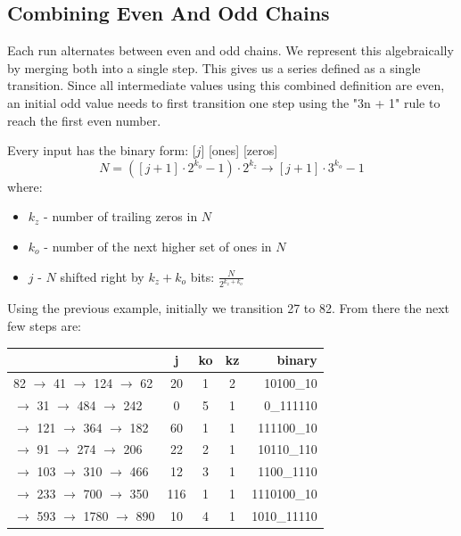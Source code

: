 \documentclass[letterpaper]{article}
\begin{document}
\begin{multicols}{2}
    \subsection{Combining Even And Odd Chains}

    Each run alternates between even and odd chains. We represent this algebraically by merging both into a single step. This gives us a series defined as a single transition. Since all intermediate values using this combined definition are even, an initial odd value needs to first transition one step using the "3n + 1" rule to reach the first even number.

    Every input has the binary form: [$j$] [ones] [zeros]
    \[
        N = ([j + 1] \cdot 2^{k_o} - 1) \cdot 2^{k_z} \rightarrow [j + 1] \cdot 3^{k_o} - 1
    \]
    where:
    \begin{itemize}
        \item $k_z$ - number of trailing zeros in $N$
        \item $k_o$ - number of the next higher set of ones in $N$
        \item $j$ - $N$ shifted right by $k_z + k_o$ bits: $\frac{N}{2^{k_z + k_o}}$
    \end{itemize}

    Using the previous example, initially we transition 27 to 82. From there the next few steps are:

    \noindent
    \begin{minipage}{\columnwidth}
        \setlength{\tabcolsep}{.35\tabcolsep}
        \centering
        \begin{tabular}{|l|c|c|c|r|}
            \hline
                                             & \textbf{j} & \textbf{ko} & \textbf{kz} & \textbf{binary} \\
            \hline
            82 $\to$ 41  $\to$  124 $\to$ 62 & 20         & 1           & 2           & 10100\_10       \\
            \hline
            $\to$ 31  $\to$  484 $\to$ 242   & 0          & 5           & 1           & 0\_111110       \\
            \hline
            $\to$ 121 $\to$  364 $\to$ 182   & 60         & 1           & 1           & 111100\_10      \\
            \hline
            $\to$  91 $\to$  274 $\to$ 206   & 22         & 2           & 1           & 10110\_110      \\
            \hline
            $\to$ 103 $\to$  310 $\to$ 466   & 12         & 3           & 1           & 1100\_1110      \\
            \hline
            $\to$ 233 $\to$  700 $\to$ 350   & 116        & 1           & 1           & 1110100\_10     \\
            \hline
            $\to$ 593 $\to$ 1780 $\to$ 890   & 10         & 4           & 1           & 1010\_11110     \\
            \hline
        \end{tabular}
    \end{minipage}


\end{multicols}
\end{document}
